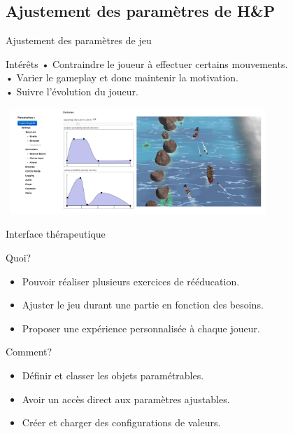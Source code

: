 \documentclass{beamer}
\begin{document}
		\subsection{Ajustement des paramètres de H\&P}	
		\begin{frame}{Ajustement des paramètres de jeu}
				\begin{block}{Intérêts}
					• Contraindre le joueur à effectuer certains mouvements.\\
					• Varier le gameplay et donc maintenir la motivation.\\
					• Suivre l'évolution du joueur.
				\end{block}
			\includegraphics[width=10cm, height=4cm]{../images/comparatif_interface_rochers.png}
		\end{frame}			
			
		\begin{frame}{Interface thérapeutique}
			\begin{block}{Quoi?}
				\begin{itemize}
					\item<1> Pouvoir réaliser plusieurs exercices de rééducation.
					\item<2> Ajuster le jeu durant une partie en fonction des besoins.
					\item<3> Proposer une expérience personnalisée à chaque joueur.
				\end{itemize}
			\end{block}
			\begin{exampleblock}{Comment?}
				\begin{itemize}
					\item<1> Définir et classer les objets paramétrables.
					\item<2> Avoir un accès direct aux paramètres ajustables.			
					\item<3> Créer et charger des configurations de valeurs.
				\end{itemize}
			\end{exampleblock}
		\end{frame}			
		
\end{document}
